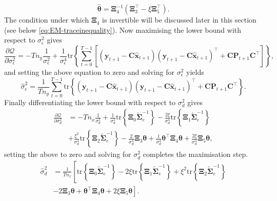 \documentclass[]{article}
\begin{document}
\begin{equation}\label{eq:thetahat}
 \hat{\boldsymbol \theta}=\boldsymbol\Xi_4^{-1}\left(\boldsymbol\Xi_3^\top-\xi\boldsymbol\Xi_5^\top \right).
\end{equation}
The condition under which $\boldsymbol\Xi_4$ is invertible will be discussed later in this section (see below \eqref{eq:EM-traceinequality}). Now maximising the lower bound with respect to $\sigma_{\epsilon}^2$ gives
\begin{equation}
  \frac{\partial \mathcal Q}{\partial \sigma_{\epsilon}^2}=-Tn_y\frac{1}{\sigma_{\epsilon}^2}+\frac{1}{\sigma_{\epsilon}^4}\mathrm{tr}\left\lbrace\sum_{t=0}^{T-1}\left[ (\mathbf y_{t+1}-\mathbf C\mathbf{\hat{x}}_{t+1}) (\mathbf y_{t+1}-\mathbf C\mathbf{\hat{x}}_{t+1})^\top+\mathbf C \mathbf P_{t+1}\mathbf C^\top\right] \right\rbrace,
\end{equation}
and setting the above equation to zero and solving for $\sigma_{\epsilon}^2$ yields
\begin{equation}\label{eq:sigmaepsilonhat}
 \hat{\sigma}_{\epsilon}^2=\frac{1}{Tn_y}\sum_{t=0}^{T-1}\mathrm{tr}\left\lbrace (\mathbf y_{t+1}-\mathbf C\mathbf{\hat{x}}_{t+1}) (\mathbf y_{t+1}-\mathbf C\mathbf{\hat{x}}_{t+1})^\top+\mathbf C \mathbf P_{t+1}\mathbf C^\top \right\rbrace.
\end{equation}
Finally differentiating the lower bound with respect to $\sigma_d^2$ gives
\begin{align}
 \frac{\partial \mathcal Q}{\partial \sigma_d^2}&= -Tn_x\frac{1}{\sigma_d^2}+\frac{1}{\sigma_d^4}\mathrm{tr}\left\lbrace \boldsymbol\Xi_0 \tilde{\boldsymbol\Sigma}_e^{-1}\right\rbrace-\frac{2\xi}{\sigma_d^4} \mathrm{tr}\left\lbrace \boldsymbol\Xi_1 \tilde{\boldsymbol\Sigma}_e^{-1}\right\rbrace  \nonumber \\
&+\frac{\xi^2}{\sigma_d^4}\mathrm{tr} \left\lbrace\boldsymbol\Xi_2\tilde{\boldsymbol\Sigma}_e^{-1} \right\rbrace-\frac{2}{\sigma_d^4}\boldsymbol\Xi_3\boldsymbol\theta +\frac{1}{\sigma_d^4}\boldsymbol\theta^\top \boldsymbol\Xi_4\boldsymbol\theta+\frac{2\xi}{\sigma_d^4} \boldsymbol\Xi_5 \boldsymbol\theta,
\end{align}
setting the above to zero and solving for $\sigma_d^2$ completes the maximisation step.
\begin{align}\label{eq:sigmadhat}
\hat{\sigma}_d^2&=\frac{1}{Tn_x}\left[ \mathrm{tr}\left\lbrace \boldsymbol\Xi_0 \tilde{\boldsymbol\Sigma}_e^{-1}\right\rbrace-
2\xi\mathrm{tr}\left\lbrace \boldsymbol\Xi_1 \tilde{\boldsymbol\Sigma}_e^{-1}\right\rbrace +\xi^2\mathrm{tr} \left\lbrace\boldsymbol\Xi_2\tilde{\boldsymbol\Sigma}_e^{-1}\right\rbrace\right.\nonumber \\ &\left.-2\boldsymbol\Xi_3\boldsymbol\theta+\boldsymbol\theta^\top\boldsymbol \Xi_4\boldsymbol\theta+2\xi\boldsymbol\Xi_5 \boldsymbol\theta\right].
\end{align}
\end{document}
